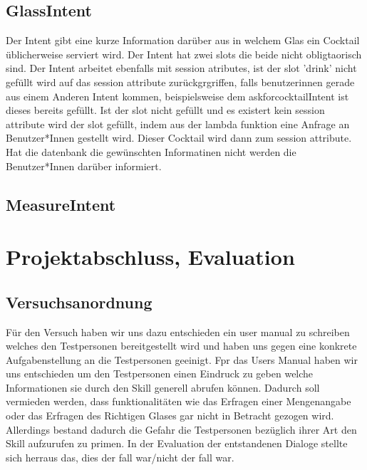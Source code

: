 \documentclass[12pt,letterpaper]{article}
\begin{document}
\subsection{GlassIntent}
Der Intent gibt eine kurze Information darüber aus in welchem Glas ein Cocktail üblicherweise serviert wird. Der Intent hat zwei slots die beide nicht obligtaorisch sind. Der Intent arbeitet ebenfalls mit session atributes, ist der slot 'drink' nicht gefüllt wird auf das session attribute zurückgrgriffen, falls benutzerinnen gerade aus einem Anderen Intent kommen, beispielsweise dem askforcocktailIntent ist dieses bereits gefüllt. Ist der slot nicht gefüllt und es existert kein session attribute wird der slot gefüllt, indem aus der lambda funktion eine Anfrage an Benutzer*Innen gestellt wird. Dieser Cocktail wird dann zum session attribute. Hat die datenbank die gewünschten Informatinen nicht werden die Benutzer*Innen darüber informiert.
\subsection{MeasureIntent}

\section{Projektabschluss, Evaluation}
\subsection{Versuchsanordnung}
Für den Versuch haben wir uns dazu entschieden ein user manual zu schreiben welches den Testpersonen
bereitgestellt wird und haben uns gegen eine konkrete Aufgabenstellung an die Testpersonen geeinigt. Fpr das Users Manual haben wir uns entschieden um den Testpersonen einen Eindruck zu geben welche Informationen sie durch den Skill generell abrufen können. Dadurch soll vermieden werden, dass funktionalitäten wie das Erfragen einer Mengenangabe oder das Erfragen des Richtigen Glases gar nicht in Betracht gezogen wird. Allerdings bestand dadurch die Gefahr die Testpersonen bezüglich ihrer Art den Skill aufzurufen zu primen.
In der Evaluation der entstandenen Dialoge stellte sich herraus das, dies der fall war/nicht der fall war.
\\
 
\end{document}

